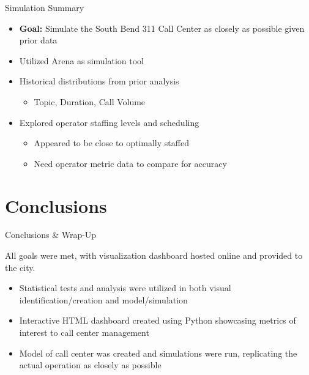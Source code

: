 \documentclass{beamer}
\begin{document}
\begin{frame}{Simulation Summary}
\begin{itemize}
	\item \textbf{Goal: }Simulate the South Bend 311 Call Center as closely as possible given prior data
	\item Utilized Arena as simulation tool
	\item Historical distributions from prior analysis
	\begin{itemize}
		\item Topic, Duration, Call Volume
	\end{itemize}
	\item Explored operator staffing levels and scheduling
		\begin{itemize}
			\item Appeared to be close to optimally staffed
			\item Need operator metric data to compare for accuracy
		\end{itemize}
\end{itemize}

\end{frame}




\section{Conclusions}

\begin{frame}{Conclusions \& Wrap-Up}

All goals were met, with visualization dashboard hosted online and provided to the city.
\begin{itemize}
	\item Statistical tests and analysis were utilized in both visual identification/creation and model/simulation
	\item Interactive HTML dashboard created using Python showcasing metrics of interest to call center management
	\item Model of call center was created and simulations were run, replicating the actual operation as closely as possible
\end{itemize}


\end{frame}
\end{document}
